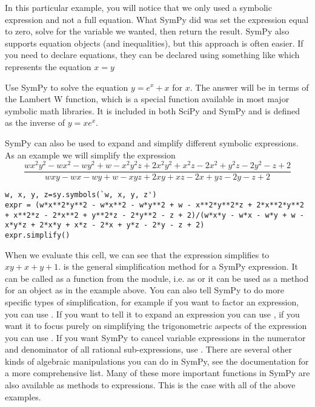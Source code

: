 In this particular example, you will notice that we only used a symbolic expression and not a full equation.
What SymPy did was set the expression equal to zero, solve for the variable we wanted, then return the result.
SymPy also supports equation objects (and inequalities), but this approach is often easier.
If you need to declare equations, they can be declared using something like  which represents the equation $x=y$

\begin{problem}
Use SymPy to solve the equation $y=e^x+x$ for $x$.
The answer will be in terms of the Lambert W function, which is a special function available in most major symbolic math libraries.
It is included in both SciPy and SymPy and is defined as the inverse of $y=x e^x$.
\end{problem}

SymPy can also be used to expand and simplify different symbolic expressions.
As an example we will simplify the expression
\begin{equation*}
\frac{w x^2 y^2 - w x^2 - w y^2 + w - x^2 y^2 z + 2 x^2 y^2 + x^2 z - 2 x^2 + y^2 z - 2 y^2 - z + 2}{w x y - w x - w y + w - x y z + 2 x y + x z - 2 x + y z - 2 y - z + 2}
\end{equation*}
\begin{lstlisting}
w, x, y, z=sy.symbols(`w, x, y, z')
expr = (w*x**2*y**2 - w*x**2 - w*y**2 + w - x**2*y**2*z + 2*x**2*y**2 + x**2*z - 2*x**2 + y**2*z - 2*y**2 - z + 2)/(w*x*y - w*x - w*y + w - x*y*z + 2*x*y + x*z - 2*x + y*z - 2*y - z + 2)
expr.simplify()
\end{lstlisting}
When we evaluate this cell, we can see that the expression simplifies to $x y + x + y +1$.
 is the general simplification method for a SymPy expression.
It can be called as a function from the module, i.e. as  or it can be used as a method for an object as in the example above.
You can also tell SymPy to do more specific types of simplification, for example if you want to factor an expression, you can use .
If you want to tell it to expand an expression you can use , if you want it to focus purely on simplifying the trigonometric aspects of the expression you can use .
If you want SymPy to cancel variable expressions in the numerator and denominator of all rational sub-expressions, use .
There are several other kinds of algebraic manipulations you can do in SymPy, see the documentation for a more comprehensive list.
Many of these more important functions in SymPy are also available as methods to expressions.
This is the case with all of the above examples.

